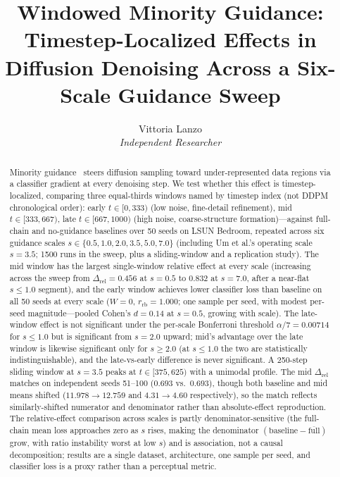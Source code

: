 \documentclass[10pt]{article}
\title{\textbf{Windowed Minority Guidance: Timestep-Localized Effects in
Diffusion Denoising Across a Six-Scale Guidance Sweep}}
\author{%
  Vittoria Lanzo \\
  \textit{Independent Researcher}
}
\date{}
\begin{document}
\maketitle

\begin{abstract}
Minority guidance~\cite{um2024minority} steers diffusion sampling toward
under-represented data regions via a classifier gradient at every denoising
step.  We test whether this effect is timestep-localized, comparing three
equal-thirds windows named by timestep index (not DDPM chronological order):
early $t\!\in\![0,333)$ (low noise, fine-detail refinement),
mid $t\!\in\![333,667)$, late $t\!\in\![667,1000)$ (high noise, coarse-structure
formation)---against full-chain and no-guidance baselines over 50 seeds on LSUN
Bedroom, repeated across six guidance scales $s\in\{0.5,1.0,2.0,3.5,5.0,7.0\}$
(including Um et al.'s operating scale $s=3.5$;
1500 runs in the sweep, plus a sliding-window and a replication study).  The
mid window has the largest single-window relative effect at every scale
(increasing across the sweep from $\Delta_\mathrm{rel}=0.456$ at $s=0.5$ to
$0.832$ at $s=7.0$, after a near-flat $s\!\le\!1.0$ segment), and the early
window achieves lower classifier loss than baseline
on all 50 seeds at every scale ($W=0$, $r_\mathrm{rb}=1.000$; one sample per
seed, with modest per-seed magnitude---pooled Cohen's $d=0.14$ at $s=0.5$, growing
with scale).  The late-window effect is not
significant under the per-scale Bonferroni threshold $\alpha/7=0.00714$ for
$s\le 1.0$ but is significant from $s=2.0$ upward; mid's advantage over the
late window is likewise significant only for $s\ge2.0$ (at $s\le1.0$ the two
are statistically indistinguishable), and the late-vs-early
difference is never significant.  A 250-step sliding window at $s=3.5$ peaks
at $t\!\in\![375,625)$ with a unimodal profile.  The mid $\Delta_\mathrm{rel}$
matches on independent seeds 51--100 ($0.693$ vs.\ $0.693$), though both
baseline and mid means shifted ($11.978\to12.759$ and $4.31\to4.60$
respectively), so the match reflects similarly-shifted numerator and denominator
rather than absolute-effect reproduction.
The relative-effect comparison across scales is partly denominator-sensitive
(the full-chain mean loss approaches zero as $s$ rises, making the denominator
$(\text{baseline}-\overline{\text{full}})$ grow, with ratio instability worst
at low $s$) and is association, not a causal decomposition; results are a
single dataset, architecture, one sample per seed, and classifier loss is a
proxy rather than a perceptual metric.
\end{abstract}
\end{document}
